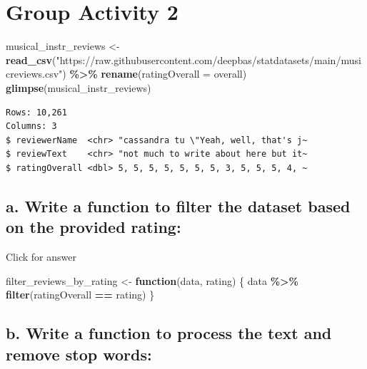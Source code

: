 \documentclass[
]{book}
\newenvironment{Shaded}{\begin{snugshade}}{\end{snugshade}}
\newcommand{\AttributeTok}[1]{\textcolor[rgb]{0.13,0.29,0.53}{#1}}
\newcommand{\ControlFlowTok}[1]{\textcolor[rgb]{0.13,0.29,0.53}{\textbf{#1}}}
\newcommand{\FunctionTok}[1]{\textcolor[rgb]{0.13,0.29,0.53}{\textbf{#1}}}
\newcommand{\NormalTok}[1]{#1}
\newcommand{\OtherTok}[1]{\textcolor[rgb]{0.56,0.35,0.01}{#1}}
\newcommand{\SpecialCharTok}[1]{\textcolor[rgb]{0.81,0.36,0.00}{\textbf{#1}}}
\newcommand{\StringTok}[1]{\textcolor[rgb]{0.31,0.60,0.02}{#1}}
\begin{document}
\hypertarget{group-activity-2-1}{%
\section{Group Activity 2}\label{group-activity-2-1}}

\begin{Shaded}
\begin{Highlighting}[]
\NormalTok{musical\_instr\_reviews }\OtherTok{\textless{}{-}}  \FunctionTok{read\_csv}\NormalTok{(}\StringTok{"https://raw.githubusercontent.com/deepbas/statdatasets/main/musicreviews.csv"}\NormalTok{) }\SpecialCharTok{\%\textgreater{}\%} 
  \FunctionTok{rename}\NormalTok{(}\AttributeTok{ratingOverall =}\NormalTok{ overall)}
\FunctionTok{glimpse}\NormalTok{(musical\_instr\_reviews)}
\end{Highlighting}
\end{Shaded}

\begin{verbatim}
Rows: 10,261
Columns: 3
$ reviewerName  <chr> "cassandra tu \"Yeah, well, that's j~
$ reviewText    <chr> "not much to write about here but it~
$ ratingOverall <dbl> 5, 5, 5, 5, 5, 5, 5, 3, 5, 5, 5, 4, ~
\end{verbatim}

\hypertarget{a.-write-a-function-to-filter-the-dataset-based-on-the-provided-rating}{%
\subsection{a. Write a function to filter the dataset based on the provided rating:}\label{a.-write-a-function-to-filter-the-dataset-based-on-the-provided-rating}}

Click for answer

\begin{Shaded}
\begin{Highlighting}[]
\NormalTok{filter\_reviews\_by\_rating }\OtherTok{\textless{}{-}} \ControlFlowTok{function}\NormalTok{(data, rating) \{}
\NormalTok{  data }\SpecialCharTok{\%\textgreater{}\%} \FunctionTok{filter}\NormalTok{(ratingOverall }\SpecialCharTok{==}\NormalTok{ rating)}
\NormalTok{\}}
\end{Highlighting}
\end{Shaded}

\hypertarget{b.-write-a-function-to-process-the-text-and-remove-stop-words}{%
\subsection{b. Write a function to process the text and remove stop words:}\label{b.-write-a-function-to-process-the-text-and-remove-stop-words}}
\end{document}
